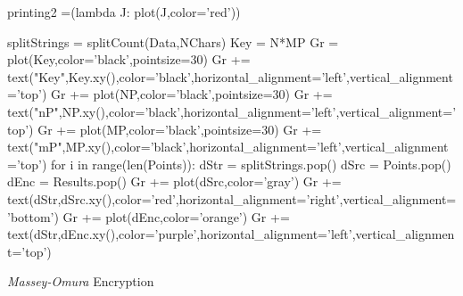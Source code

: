 \documentclass[a0,portrait]{a0poster}
\begin{document}
\begin{multicols}{2}
\begin{sagesilent}
  printing2 =(lambda J: plot(J,color='red'))

  splitStrings = splitCount(Data,NChars)
  Key = N*MP
  Gr = plot(Key,color='black',pointsize=30)
  Gr += text("Key",Key.xy(),color='black',horizontal_alignment='left',vertical_alignment='top')
  Gr += plot(NP,color='black',pointsize=30)
  Gr += text("nP",NP.xy(),color='black',horizontal_alignment='left',vertical_alignment='top')
  Gr += plot(MP,color='black',pointsize=30)
  Gr += text("mP",MP.xy(),color='black',horizontal_alignment='left',vertical_alignment='top')
  for i in range(len(Points)):
    dStr = splitStrings.pop()
    dSrc = Points.pop()
    dEnc = Results.pop()
    Gr += plot(dSrc,color='gray')
    Gr += text(dStr,dSrc.xy(),color='red',horizontal_alignment='right',vertical_alignment='bottom')
    Gr += plot(dEnc,color='orange')
    Gr += text(dStr,dEnc.xy(),color='purple',horizontal_alignment='left',vertical_alignment='top')
  
\end{sagesilent}
\def\bitMax{192\xspace}


\begin{slide}{{\em Massey-Omura} Encryption}


\end{slide}
\end{multicols}
\end{document}
